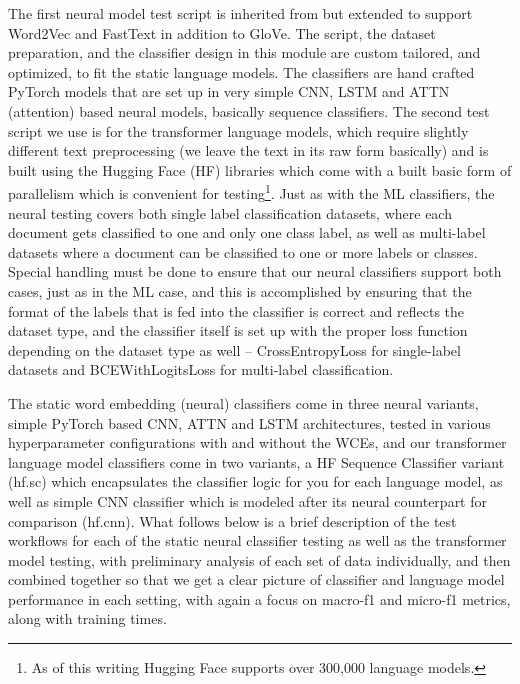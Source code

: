\documentclass[final]{clv2025}
\begin{document}
The first neural model test script is inherited from \cite{moreo} but extended to support Word2Vec and FastText in addition to GloVe. The script, the dataset preparation, and the classifier design in this module are custom tailored, and optimized, to fit the static language models. The classifiers are hand crafted PyTorch models that are set up in very simple CNN, LSTM and ATTN (attention) based neural models, basically sequence classifiers. The second test script we use is for the transformer language models, which require slightly different text preprocessing (we leave the text in its raw form basically) and is built using the Hugging Face (HF) libraries which come with a built basic form of parallelism which is convenient for testing\footnote{  As of this writing Hugging Face supports over 300,000 language models.}.  
Just as with the ML classifiers, the neural testing covers both single label classification datasets, where each document gets classified to one and only one class label, as well as multi-label datasets where a document can be classified to one or more labels or classes. Special handling must be done to ensure that our neural classifiers support both cases, just as in the ML case, and this is accomplished by ensuring that the format of the labels that is fed into the classifier is correct and reflects the dataset type, and the classifier itself is set up with the proper loss function depending on the dataset type as well – CrossEntropyLoss for single-label datasets and BCEWithLogitsLoss for multi-label classification.

The static word embedding (neural) classifiers come in three neural variants, simple PyTorch based CNN, ATTN and LSTM architectures, tested in various hyperparameter configurations with and without the WCEs, and our transformer language model classifiers come in two variants, a HF Sequence Classifier variant (hf.sc) which encapsulates the classifier logic for you for each language model, as well as simple CNN classifier which is modeled after its neural counterpart for comparison (hf.cnn). What follows below is a brief description of the test workflows for each of the static neural classifier testing as well as the transformer model testing, with preliminary analysis of each set of data individually, and then combined together so that we get a clear picture of classifier and language model performance in each setting, with again a focus on macro-f1 and micro-f1 metrics, along with training times. 
\end{document}
